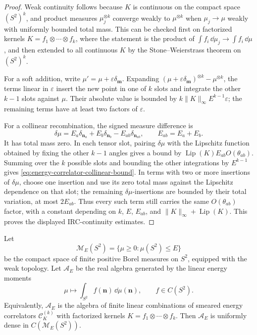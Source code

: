 \begin{proof}
Weak continuity follows because \(K\) is continuous on the compact space
\((S^2)^k\), and product measures \(\mu_j^{\otimes k}\) converge weakly to
\(\mu^{\otimes k}\) when \(\mu_j\to\mu\) weakly with uniformly bounded total
mass.  This can be checked first on factorized kernels
\(K=f_1\otimes\cdots\otimes f_k\), where the statement is the product of
\(\int f_i\,\dd\mu_j\to\int f_i\,\dd\mu\), and then extended to all
continuous \(K\) by the Stone--Weierstrass theorem on \((S^2)^k\).

For a soft addition, write
\(\mu'=\mu+\varepsilon\delta_{\mathbf m}\).  Expanding
\((\mu+\varepsilon\delta_{\mathbf m})^{\otimes k}-\mu^{\otimes k}\), the
terms linear in \(\varepsilon\) insert the new point in one of \(k\) slots
and integrate the other \(k-1\) slots against \(\mu\).  Their absolute value
is bounded by \(k\|K\|_\infty E^{k-1}\varepsilon\); the remaining terms have
at least two factors of \(\varepsilon\).

For a collinear recombination, the signed measure difference is
\[
  \delta\mu
  =
  E_a\delta_{\mathbf n_a}
  +E_b\delta_{\mathbf n_b}
  -E_{ab}\delta_{\mathbf n_{ab}},
  \qquad E_{ab}=E_a+E_b .
\]
It has total mass zero.  In each tensor slot, pairing \(\delta\mu\) with the
Lipschitz function obtained by fixing the other \(k-1\) angles gives a bound
by \(\operatorname{Lip}(K)E_{ab}O(\theta_{ab})\).  Summing over the \(k\)
possible slots and bounding the other integrations by \(E^{k-1}\) gives
\eqref{eq:energy-correlator-collinear-bound}.  In terms with two or more
insertions of \(\delta\mu\), choose one insertion and use its zero total mass
against the Lipschitz dependence on that slot; the remaining
\(\delta\mu\)-insertions are bounded by their total variation, at most
\(2E_{ab}\).  Thus every such term still carries the same
\(O(\theta_{ab})\) factor, with a constant depending on \(k\), \(E\),
\(E_{ab}\), and \(\|K\|_\infty+\operatorname{Lip}(K)\).  This proves the
displayed IRC-continuity estimates.
\end{proof}

\begin{theorem}
\label{thm:energy-correlator-polynomial-density}
Let
\[
  \mathcal M_E(S^2)=\{\mu\ge0:\mu(S^2)\le E\}
\]
be the compact space of finite positive Borel measures on \(S^2\), equipped
with the weak topology.  Let \(\mathcal A_E\) be the real algebra generated
by the linear energy moments
\[
  \mu\longmapsto \int_{S^2}f(\mathbf n)\,\dd\mu(\mathbf n),
  \qquad f\in C(S^2).
\]
Equivalently, \(\mathcal A_E\) is the algebra of finite linear combinations
of smeared energy correlators
\(\mathcal C_K^{(k)}\) with factorized kernels
\(K=f_1\otimes\cdots\otimes f_k\).  Then \(\mathcal A_E\) is uniformly dense
in \(C(\mathcal M_E(S^2))\).
\end{theorem}

